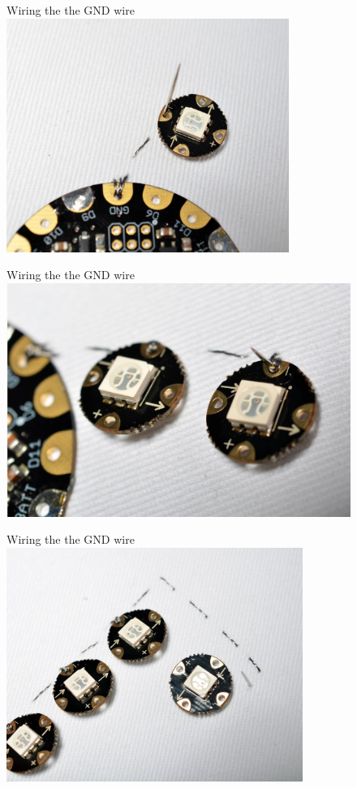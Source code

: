 \documentclass{beamer}
\begin{document}
\begin{frame}[fragile]{Wiring the the GND wire}
\includegraphics[height=3in]{flora_DSC_0113.jpg}
\end{frame}
\begin{frame}[fragile]{Wiring the the GND wire}
\includegraphics[height=3in]{flora_DSC_0115.jpg}
\end{frame}
\begin{frame}[fragile]{Wiring the the GND wire}
\includegraphics[height=3in]{flora_DSC_0116.jpg}
\end{frame}
\end{document}
